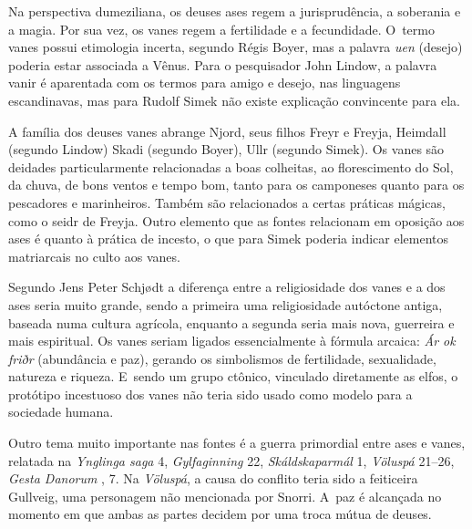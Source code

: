 
Na perspectiva dumeziliana, os deuses ases regem a jurisprudência, a
soberania e a magia. Por sua vez, os vanes regem a fertilidade e a
fecundidade. O~termo vanes possui etimologia incerta, segundo Régis
Boyer, mas a palavra \emph{uen} (desejo) poderia estar associada a
Vênus. Para o pesquisador John Lindow, a palavra vanir é aparentada com
os termos para amigo e desejo, nas linguagens escandinavas, mas para
Rudolf Simek não existe explicação convincente para ela.

A família dos deuses vanes abrange Njord, seus filhos Freyr e Freyja,
Heimdall (segundo Lindow) Skadi (segundo Boyer), Ullr (segundo Simek).
Os vanes são deidades particularmente relacionadas a boas colheitas, ao
florescimento do Sol, da chuva, de bons ventos e tempo bom, tanto para
os camponeses quanto para os pescadores e marinheiros. Também são
relacionados a certas práticas mágicas, como o seidr de Freyja. Outro
elemento que as fontes relacionam em oposição aos ases é quanto à
prática de incesto, o que para Simek poderia indicar elementos
matriarcais no culto aos vanes.

Segundo Jens Peter Schjødt a diferença entre a religiosidade dos vanes e
a dos ases seria muito grande, sendo a primeira uma religiosidade
autóctone antiga, baseada numa cultura agrícola, enquanto a segunda
seria mais nova, guerreira e mais espiritual. Os vanes seriam ligados
essencialmente à fórmula arcaica: \emph{Ár ok friðr} (abundância e paz),
gerando os simbolismos de fertilidade, sexualidade, natureza e riqueza.
E~sendo um grupo ctônico, vinculado diretamente as elfos, o protótipo
incestuoso dos vanes não teria sido usado como modelo para a sociedade
humana.

Outro tema muito importante nas fontes é a guerra primordial entre ases
e vanes, relatada na \emph{Ynglinga saga} 4, \emph{Gylfaginning} 22,
\emph{Skáldskaparmál} 1, \emph{Völuspá} 21--26, \emph{Gesta Danorum} ,
7. Na \emph{Völuspá}, a causa do conflito teria sido a feiticeira
Gullveig, uma personagem não mencionada por Snorri. A~paz é alcançada no
momento em que ambas as partes decidem por uma troca mútua de deuses.

